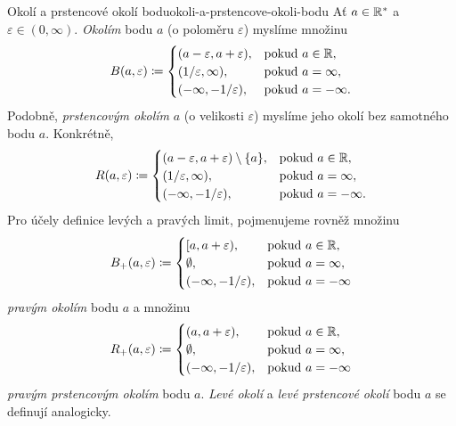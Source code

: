 \begin{definition}{Okolí a prstencové okolí bodu}{okoli-a-prstencove-okoli-bodu}
Ať $a \in \mathbb{R}^*$ a $\varepsilon \in (0,\infty)$. \emph{Okolím} bodu $a$ (o
poloměru $\varepsilon$) myslíme množinu
\[
 B(a,\varepsilon) \coloneqq \begin{cases}
  (a-\varepsilon,a+\varepsilon), & \text{pokud } a \in \mathbb{R},\\
  (1 / \varepsilon, \infty), &\text{pokud } a = \infty,\\
  (-\infty,-1 / \varepsilon), &\text{pokud } a = -\infty.
 \end{cases}
\]
Podobně, \emph{prstencovým okolím} $a$ (o velikosti $\varepsilon$) myslíme jeho
okolí bez samotného bodu $a$. Konkrétně,
\[
 R(a,\varepsilon) \coloneqq \begin{cases}
  (a-\varepsilon,a+\varepsilon) \setminus \{a\}, &\text{pokud }a \in \mathbb{R},\\
  (1 / \varepsilon,\infty), & \text{pokud } a = \infty,\\
  (-\infty,-1 / \varepsilon), &\text{pokud } a = -\infty.
 \end{cases}
\]
Pro účely definice levých a pravých limit, pojmenujeme rovněž množinu
\[
 B_+(a,\varepsilon) \coloneqq \begin{cases}
  [a,a+\varepsilon), &\text{pokud }a \in \mathbb{R},\\
  \emptyset, &\text{pokud }a = \infty,\\
  (-\infty,-1 / \varepsilon), &\text{pokud }a = -\infty
 \end{cases}
\]
\emph{pravým okolím} bodu $a$ a množinu
\[
 R_+(a,\varepsilon) \coloneqq \begin{cases}
  (a,a+\varepsilon), &\text{pokud }a \in \mathbb{R},\\
  \emptyset, &\text{pokud }a = \infty,\\
  (-\infty,-1 / \varepsilon), &\text{pokud }a = -\infty
 \end{cases}
\]
\emph{pravým prstencovým okolím} bodu $a$. \emph{Levé okolí} a \emph{levé
prstencové okolí} bodu $a$ se definují analogicky.
\end{definition}

